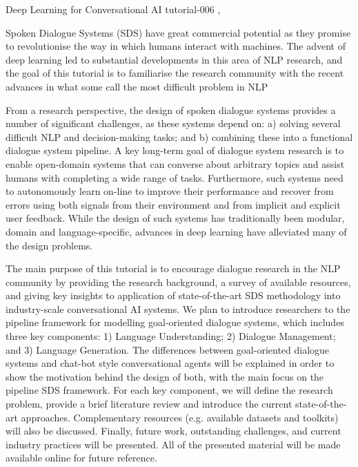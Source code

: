\begin{tutorial}
  {Deep Learning for Conversational AI}
  {tutorial-006}
  {\daydateyear, \tutorialafternoontime}
  {\TutLocF}
\end{tutorial}

Spoken Dialogue Systems (SDS) have great commercial potential as they promise to revolutionise the way in which humans interact with machines. The advent of deep learning led to substantial developments in this area of NLP research, and the goal of this tutorial is to familiarise the research community with the recent advances in what some call the most difficult problem in NLP

From a research perspective, the design of spoken dialogue systems provides a number of significant challenges, as these systems depend on: a) solving several difficult NLP and decision-making tasks; and b) combining these into a functional dialogue system pipeline. A key long-term goal of dialogue system research is to enable open-domain systems that can converse about arbitrary topics and assist humans with completing a wide range of tasks. Furthermore, such systems need to autonomously learn on-line to improve their performance and recover from errors using both signals from their environment and from implicit and explicit user feedback. While the design of such systems has traditionally been modular, domain and language-specific, advances in deep learning have alleviated many of the design problems.

The main purpose of this tutorial is to encourage dialogue research in the NLP community by providing the research background, a survey of available resources, and giving key insights to application of state-of-the-art SDS methodology into industry-scale conversational AI systems. We plan to introduce researchers to the pipeline framework for modelling goal-oriented dialogue systems, which includes three key components: 1) Language Understanding; 2) Dialogue Management; and 3) Language Generation. The differences between goal-oriented dialogue systems and chat-bot style conversational agents will be explained in order to show the motivation behind the design of both, with the main focus on the pipeline SDS framework. For each key component, we will define the research problem, provide a brief literature review and introduce the current state-of-the-art approaches. Complementary resources (e.g. available datasets and toolkits) will also be discussed. Finally, future work, outstanding challenges, and current industry practices will be presented. All of the presented material will be made available online for future reference.

